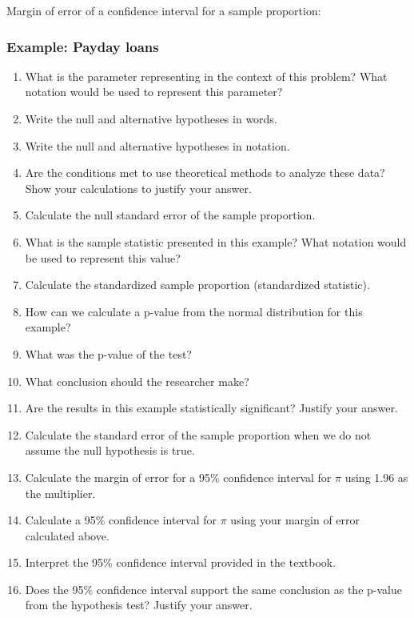 \documentclass[
]{report}
\newcommand{\rgs}{\vspace{12pt}} %
\begin{document}
Margin of error of a confidence interval for a sample proportion:
\rgs

\hypertarget{example-payday-loans}{%
\subsubsection*{Example: Payday loans}\label{example-payday-loans}}

\begin{enumerate}
\def\labelenumi{\arabic{enumi}.}
\item
  What is the parameter representing in the context of this problem? What notation would be used to represent this parameter?
  \rgs
  \rgs
\item
  Write the null and alternative hypotheses in words.
  \rgs
  \rgs
\item
  Write the null and alternative hypotheses in notation.
  \rgs
\item
  Are the conditions met to use theoretical methods to analyze these data? Show your calculations to justify your answer.
  \rgs
  \rgs
\item
  Calculate the null standard error of the sample proportion.
  \rgs
  \rgs
\item
  What is the sample statistic presented in this example? What notation would be used to represent this value?
  \rgs
\item
  Calculate the standardized sample proportion (standardized statistic).
  \rgs
  \rgs
\item
  How can we calculate a p-value from the normal distribution for this example?
  \rgs
  \rgs
\item
  What was the p-value of the test?
  \rgs
\item
  What conclusion should the researcher make?
  \rgs
  \rgs
\item
  Are the results in this example statistically significant? Justify your answer.
  \rgs
\item
  Calculate the standard error of the sample proportion when we do not assume the null hypothesis is true.
  \rgs
  \rgs
\item
  Calculate the margin of error for a 95\% confidence interval for \(\pi\) using 1.96 as the multiplier.
  \rgs
  \rgs
\item
  Calculate a 95\% confidence interval for \(\pi\) using your margin of error calculated above.
  \rgs
  \rgs
\item
  Interpret the 95\% confidence interval provided in the textbook.
  \rgs
  \rgs
\item
  Does the 95\% confidence interval support the same conclusion as the p-value from the hypothesis test? Justify your answer.
  \rgs
\end{enumerate}
\end{document}

